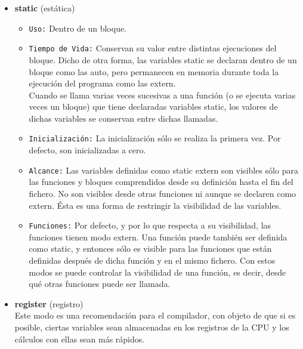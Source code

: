 \documentclass[letterpaper]{report}
\begin{document}
\begin{itemize}
\item \textbf{static} (estática)
  \begin{itemize}
    \item \texttt{Uso:} Dentro de un bloque.
    \item \texttt{Tiempo de Vida:} Conservan su valor entre distintas ejecuciones del bloque. Dicho de otra forma, las variables static se declaran dentro de un bloque como las auto, pero permanecen en memoria durante toda la ejecución del programa como las extern.\\
Cuando se llama varias veces sucesivas a una función (o se ejecuta varias veces un bloque) que tiene declaradas variables static, los valores de dichas variables se conservan entre dichas llamadas.
 \item \texttt{Inicialización:} La inicialización sólo se realiza la primera vez. Por defecto, son inicializadas a cero.
 \item \texttt{Alcance:} Las variables definidas como static extern son visibles sólo para las funciones y bloques comprendidos desde su definición hasta el fin del fichero. No son visibles desde otras funciones ni aunque se declaren como extern. Ésta es una forma de restringir la visibilidad de las variables.
 \item \texttt{Funciones:} Por defecto, y por lo que respecta a su visibilidad, las funciones tienen modo extern. Una función puede también ser definida como static, y entonces sólo es visible para las funciones que están definidas después de dicha función y en el mismo fichero. Con estos modos se puede controlar la visibilidad de una función, es decir, desde qué otras funciones puede ser llamada.
  \end{itemize}
\item \textbf{register} (registro)\\
Este modo es una recomendación para el compilador, con objeto de que si es posible, ciertas variables sean almacenadas en los registros de la CPU y los cálculos con ellas sean más rápidos.
\end{itemize}
\pagebreak
\end{document}
